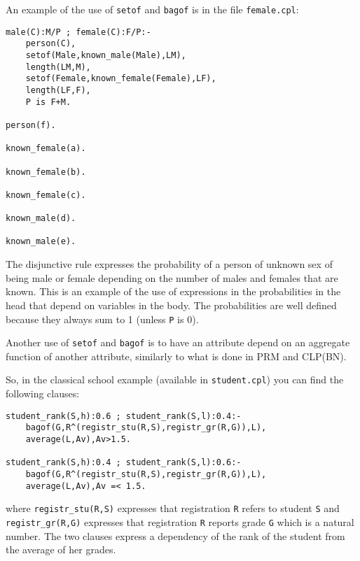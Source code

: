 \documentclass{article}
\begin{document}
An example of the use of \texttt{setof} and \texttt{bagof} is in the file \texttt{female.cpl}:
\begin{verbatim}
male(C):M/P ; female(C):F/P:-
    person(C),
    setof(Male,known_male(Male),LM),
    length(LM,M),
    setof(Female,known_female(Female),LF),
    length(LF,F),
    P is F+M.

person(f).

known_female(a).

known_female(b).

known_female(c).

known_male(d).

known_male(e).
\end{verbatim}
The disjunctive rule expresses the probability of a person of unknown sex of being male or female depending on the number of males and females that are known.
This is an example of the use of expressions in the probabilities in the head that depend on variables in the body. The probabilities are well defined because they always sum to 1 (unless \texttt{P} is 0).

Another use of \texttt{setof} and \texttt{bagof} is to have an attribute depend on an aggregate function of another attribute, similarly to what is done in PRM and CLP(BN).

So, in the classical school example (available in \texttt{student.cpl}) you can find the following
clauses:
\begin{verbatim}
student_rank(S,h):0.6 ; student_rank(S,l):0.4:- 
    bagof(G,R^(registr_stu(R,S),registr_gr(R,G)),L),
    average(L,Av),Av>1.5.

student_rank(S,h):0.4 ; student_rank(S,l):0.6:- 
    bagof(G,R^(registr_stu(R,S),registr_gr(R,G)),L),
    average(L,Av),Av =< 1.5.
\end{verbatim}
where \verb|registr_stu(R,S)| expresses that registration \texttt{R} refers to student \texttt{S} and \verb|registr_gr(R,G)| expresses that registration \texttt{R} reports  grade \texttt{G} which is a natural number. The two clauses express a dependency of the rank of the student from the average of her grades.
\end{document}
